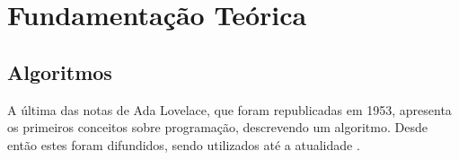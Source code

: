 
\chapter{Fundamentação Teórica}

\section{Algoritmos}

\ifdraft{\color{green}}{}A última das notas de Ada Lovelace, que foram republicadas em 1953\nocite{1253887}, apresenta os
primeiros conceitos sobre programação, descrevendo um algoritmo. Desde então
estes foram difundidos, sendo utilizados até a atualidade
\cite{santiago2003etal}.\color{black}




